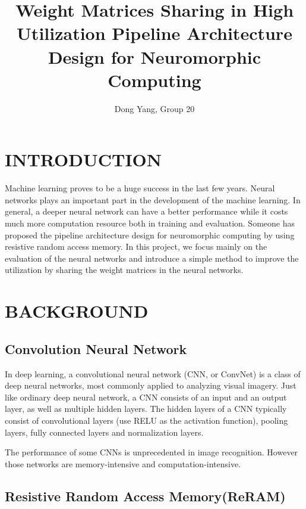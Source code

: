 \documentclass[letterpaper, 10 pt, conference]{ieeeconf}  %
\title{\LARGE \bf
Weight Matrices Sharing in High Utilization Pipeline Architecture Design for Neuromorphic Computing
}
\author{Dong Yang, Group 20%
}
\begin{document}
\maketitle
\thispagestyle{empty}
\pagestyle{empty}






\section{INTRODUCTION}
Machine learning proves to be a huge success in the last few years. Neural networks plays an important part in the development of the machine learning. In general, a deeper neural network can have a better performance while it costs much more computation resource both in training and evaluation. Someone has proposed the pipeline architecture design for neuromorphic computing by using resistive random access memory. In this project, we focus mainly on the evaluation of the neural networks and introduce a simple method to improve the utilization by sharing the weight matrices in the neural networks.
\section{BACKGROUND}

\subsection{Convolution Neural Network}
In deep learning, a convolutional neural network (CNN, or ConvNet) is a class of deep neural networks, most commonly applied to analyzing visual imagery. Just like ordinary deep neural network, a CNN consists of an input and an output layer, as well as multiple hidden layers. The hidden layers of a CNN typically consist of convolutional layers (use RELU as the activation function), pooling layers, fully connected layers and normalization layers.

The performance of some CNNs is unprecedented in image recognition. However those networks are memory-intensive and computation-intensive.

\subsection{Resistive Random Access Memory(ReRAM)}
\end{document}
